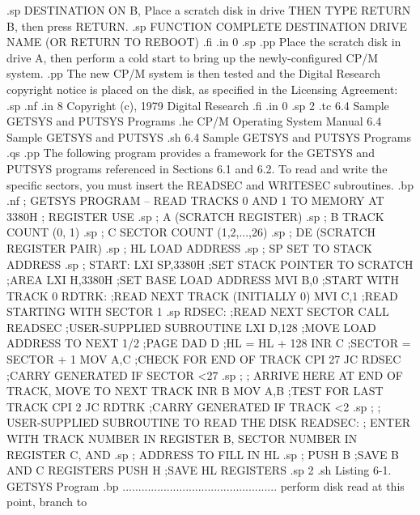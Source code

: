 .sp
DESTINATION ON B,         Place a scratch disk in drive
THEN TYPE RETURN          B, then press RETURN.
.sp
FUNCTION COMPLETE
DESTINATION DRIVE NAME
(OR RETURN TO REBOOT)
.fi
.in 0
.sp
.pp
Place the scratch disk in drive A, then 
perform a cold start to bring up the newly-configured CP/M 
system.
.pp
The new CP/M system is then tested and the Digital Research 
copyright notice is placed on the disk, as specified in the 
Licensing Agreement:
.sp
.nf
.in 8
Copyright (c), 1979
 Digital Research
.fi
.in 0
.sp 2
.tc    6.4  Sample GETSYS and PUTSYS Programs
.he CP/M Operating System Manual        6.4  Sample GETSYS and PUTSYS
.sh
6.4  Sample GETSYS and PUTSYS Programs
.qs
.pp
The following program provides a framework for the GETSYS and 
PUTSYS programs referenced in Sections 6.1 and 6.2.  To read and
write the specific sectors, you must insert the READSEC and WRITESEC
subroutines.
.bp
.nf
;  GETSYS PROGRAM -- READ TRACKS 0 AND 1 TO MEMORY AT 3380H
;  REGISTER                    USE
.sp
;         A               (SCRATCH REGISTER)
.sp
;         B               TRACK COUNT (0, 1)
.sp
;         C               SECTOR COUNT (1,2,...,26)
.sp
;         DE              (SCRATCH REGISTER PAIR)
.sp
;         HL              LOAD ADDRESS
.sp
;         SP              SET TO STACK ADDRESS
.sp
;
START:    LXI  SP,3380H   ;SET STACK POINTER TO SCRATCH
                          ;AREA
          LXI  H,3380H    ;SET BASE LOAD ADDRESS
          MVI  B,0        ;START WITH TRACK 0
RDTRK:                    ;READ NEXT TRACK (INITIALLY 0)
          MVI  C,1        ;READ STARTING WITH SECTOR 1
.sp
RDSEC:                    ;READ NEXT SECTOR
          CALL READSEC    ;USER-SUPPLIED SUBROUTINE
          LXI  D,128      ;MOVE LOAD ADDRESS TO NEXT 1/2
                          ;PAGE
          DAD  D          ;HL = HL + 128
          INR  C          ;SECTOR = SECTOR + 1
          MOV  A,C        ;CHECK FOR END OF TRACK
          CPI  27
          JC   RDSEC      ;CARRY GENERATED IF SECTOR <27
.sp
;
;  ARRIVE HERE AT END OF TRACK, MOVE TO NEXT TRACK
          INR  B
          MOV  A,B        ;TEST FOR LAST TRACK
          CPI  2
          JC   RDTRK      ;CARRY GENERATED IF TRACK <2
.sp
;
;  USER-SUPPLIED SUBROUTINE TO READ THE DISK
READSEC:
;  ENTER WITH TRACK NUMBER IN REGISTER B,
          SECTOR NUMBER IN REGISTER C, AND
.sp
;         ADDRESS TO FILL IN HL
.sp
;
          PUSH B          ;SAVE B AND C REGISTERS
          PUSH H          ;SAVE HL REGISTERS
.sp 2
.sh
                  Listing 6-1.  GETSYS Program
.bp
          .................................................
          perform disk read at this point, branch to
